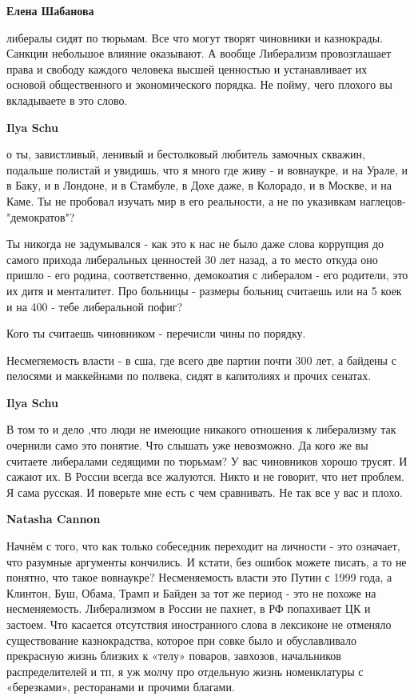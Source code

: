 \begin{itemize}
\begin{itemize}
\textbf{Елена Шабанова} 

либералы сидят по тюрьмам. Все что могут творят чиновники и казнокрады. Санкции
небольшое влияние оказывают. А вообще Либерализм провозглашает права и свободу
каждого человека высшей ценностью и устанавливает их основой общественного и
экономического порядка. Не пойму, чего плохого вы вкладываете в это слово.


\textbf{Ilya Schu} 

о ты, завистливый, ленивый и бестолковый любитель замочных скважин, подальше
полистай и увидишь, что я много где живу - и вовнаукре, и на Урале, и в Баку, и
в Лондоне, и в Стамбуле, в Дохе даже, в Колорадо, и в Москве, и на Каме. Ты не
пробовал изучать мир в его реальности, а не по указивкам наглецов-"демократов"?

Ты никогда не задумывался - как это к нас не было даже слова коррупция до
самого прихода либеральных ценностей 30 лет назад, а то место откуда оно пришло
- его родина, соответственно, демокоатия с либералом - его родители, это их
дитя и менталитет. Про больницы - размеры больниц считаешь или на 5 коек и на
400 - тебе либеральной пофиг?

Кого ты считаешь чиновником - перечисли чины по порядку.

Несмегяемость власти - в сша, где всего две партии почти 300 лет, а байдены с
пелосями и маккейнами по полвека, сидят в капитолиях и прочих сенатах.

\textbf{Ilya Schu} 

В том то и дело ,что люди не имеющие никакого отношения к либерализму так
очернили само это понятие. Что слышать уже невозможно. Да кого же вы считаете
либералами седящими по тюрьмам? У вас чиновников хорошо трусят. И сажают их. В
России всегда все жалуются. Никто и не говорит, что нет проблем. Я сама русская. И
поверьте мне есть с чем сравнивать. Не так все у вас и плохо.

\textbf{Natasha Cannon} 

Начнём с того, что как только собеседник переходит на личности - это означает,
что разумные аргументы кончились. И кстати, без ошибок можете писать, а то не
понятно, что такое вовнаукре? Несменяемость власти это Путин с 1999 года, а
Клинтон, Буш, Обама, Трамп и Байден за тот же период - это не похоже на
несменяемость. Либерализмом в России не пахнет, в РФ попахивает ЦК и застоем.
Что касается отсутствия иностранного слова в лексиконе не отменяло
существование казнокрадства, которое при совке было и обуславливало прекрасную
жизнь близких к «телу» поваров, завхозов, начальников распределителей и тп, я
уж молчу про отдельную жизнь номенклатуры с «березками», ресторанами и прочими
благами.


\end{itemize}
\end{itemize}

